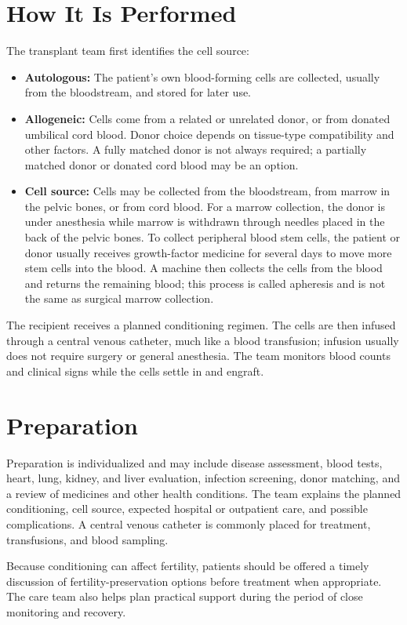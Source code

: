 \section*{How It Is Performed}
The transplant team first identifies the cell source:
\begin{itemize}
  \item \textbf{Autologous:} The patient's own blood-forming cells are collected, usually from the bloodstream, and stored for later use.
  \item \textbf{Allogeneic:} Cells come from a related or unrelated donor, or from donated umbilical cord blood. Donor choice depends on tissue-type compatibility and other factors. A fully matched donor is not always required; a partially matched donor or donated cord blood may be an option.
  \item \textbf{Cell source:} Cells may be collected from the bloodstream, from marrow in the pelvic bones, or from cord blood. For a marrow collection, the donor is under anesthesia while marrow is withdrawn through needles placed in the back of the pelvic bones. To collect peripheral blood stem cells, the patient or donor usually receives growth-factor medicine for several days to move more stem cells into the blood. A machine then collects the cells from the blood and returns the remaining blood; this process is called apheresis and is not the same as surgical marrow collection.
\end{itemize}

The recipient receives a planned conditioning regimen. The cells are then infused through a central venous catheter, much like a blood transfusion; infusion usually does not require surgery or general anesthesia. The team monitors blood counts and clinical signs while the cells settle in and engraft.

\section*{Preparation}
Preparation is individualized and may include disease assessment, blood tests, heart, lung, kidney, and liver evaluation, infection screening, donor matching, and a review of medicines and other health conditions. The team explains the planned conditioning, cell source, expected hospital or outpatient care, and possible complications. A central venous catheter is commonly placed for treatment, transfusions, and blood sampling.

Because conditioning can affect fertility, patients should be offered a timely discussion of fertility-preservation options before treatment when appropriate. The care team also helps plan practical support during the period of close monitoring and recovery.


